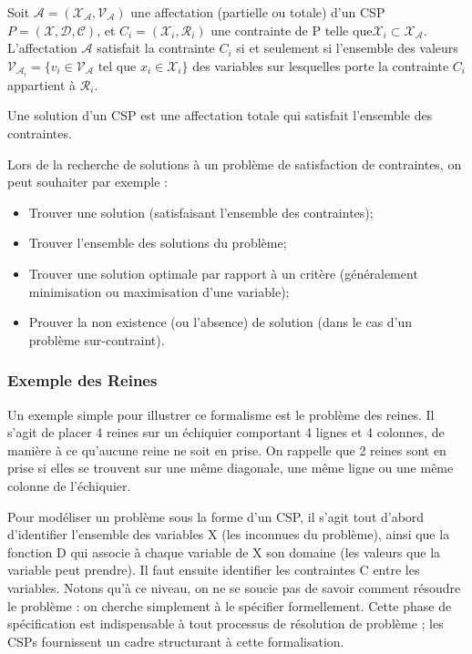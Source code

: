 \begin{definition} Soit $\mathcal{A} = (\mathcal{X_{\mathcal{A}}}, \mathcal{V_{\mathcal{A}}})$ une affectation (partielle ou totale) d'un CSP $P = (\mathcal{X},\mathcal{D},\mathcal{C})$, et $C_i = (\mathcal{X}_i, \mathcal{R}_i)$ une contrainte de P telle que$ \mathcal{X}_i \subset \mathcal{X_{\mathcal{A}}}$. 
	L'affectation $\mathcal{A}$ satisfait la contrainte $C_i$ si et seulement si l'ensemble des valeurs $\mathcal{V}_{\mathcal{A}_i} = \{ v_i \in \mathcal{V}_{\mathcal{A}} \mbox{ tel que } x_i \in \mathcal{X}_{i} \}$ des variables sur lesquelles porte la contrainte $C_i$ appartient à $\mathcal{R}_i$.
	\label{def:affecPar-csp}
\end{definition}

\begin{definition} Une solution d'un CSP est une affectation totale qui satisfait l'ensemble des contraintes.
	\label{def:sol-csp}
\end{definition}

Lors de la recherche de solutions à un problème de satisfaction de contraintes, on peut souhaiter par exemple :
\begin{itemize}
	\item Trouver une solution (satisfaisant l'ensemble des contraintes);
	\item Trouver l'ensemble des solutions du problème;
	\item Trouver une solution optimale par rapport à un critère (généralement minimisation ou maximisation d'une variable);
	\item Prouver la non existence (ou l'absence) de solution (dans le cas d'un problème sur-contraint).
\end{itemize}
\subsubsection{Exemple des Reines}
Un exemple simple pour illustrer ce formalisme est le problème des reines. Il s'agit de placer 4 reines sur un échiquier comportant 4 lignes et 4 colonnes, de manière à ce qu'aucune reine ne soit en prise. On rappelle que 2 reines sont en prise si elles se trouvent sur une même diagonale, une même ligne ou une même colonne de l'échiquier.

Pour modéliser un problème sous la forme d'un CSP, il s'agit tout d'abord d'identifier l'ensemble des variables X (les inconnues du problème), ainsi que la fonction D qui associe à chaque variable de X son domaine (les valeurs que la variable peut prendre). Il faut ensuite identifier les contraintes C entre les variables. Notons qu'à ce niveau, on ne se soucie pas de savoir comment résoudre le problème : on cherche simplement à le spécifier formellement. Cette phase de spécification est indispensable à tout processus de résolution de problème ; les CSPs fournissent un cadre structurant à cette formalisation.

